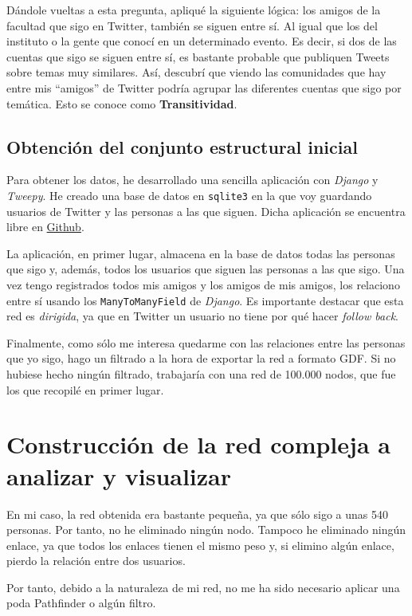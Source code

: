 \documentclass[10pt,a4paper,spanish]{article}
\numberwithin{equation}{section} %
\numberwithin{figure}{section} %
\numberwithin{table}{section} %
\begin{document}
Dándole vueltas a esta pregunta, apliqué la siguiente lógica: los amigos de la facultad que sigo en Twitter, también se siguen entre sí. Al igual que los del instituto o la gente que conocí en un determinado evento. Es decir, si dos de las cuentas que sigo se siguen entre sí, es bastante probable que publiquen Tweets sobre temas muy similares. Así, descubrí que viendo las comunidades que hay entre mis ``amigos'' de Twitter podría agrupar las diferentes cuentas que sigo por temática. Esto se conoce como \textbf{Transitividad}.

\subsection{Obtención del conjunto estructural inicial}
Para obtener los datos, he desarrollado una sencilla aplicación con \textit{Django} y \textit{Tweepy}. He creado una base de datos en \texttt{sqlite3} en la que voy guardando usuarios de Twitter y las personas a las que siguen. Dicha aplicación se encuentra libre en \href{https://github.com/mgmacias95/TwitterFriends}{Github}.

La aplicación, en primer lugar, almacena en la base de datos todas las personas que sigo y, además, todos los usuarios que siguen las personas a las que sigo. Una vez tengo registrados todos mis amigos y los amigos de mis amigos, los relaciono entre sí usando los \texttt{ManyToManyField} de \textit{Django}. Es importante destacar que esta red es \textit{dirigida}, ya que en Twitter un usuario no tiene por qué hacer \textit{follow back}.

Finalmente, como sólo me interesa quedarme con las relaciones entre las personas que yo sigo, hago un filtrado a la hora de exportar la red a formato GDF. Si no hubiese hecho ningún filtrado, trabajaría con una red de 100.000 nodos, que fue los que recopilé en primer lugar.

\section{Construcción de la red compleja a analizar y visualizar}
En mi caso, la red obtenida era bastante pequeña, ya que sólo sigo a unas 540 personas. Por tanto, no he eliminado ningún nodo. Tampoco he eliminado ningún enlace, ya que todos los enlaces tienen el mismo peso y, si elimino algún enlace, pierdo la relación entre dos usuarios. 

Por tanto, debido a la naturaleza de mi red, no me ha sido necesario aplicar una poda Pathfinder o algún filtro.
\end{document}

